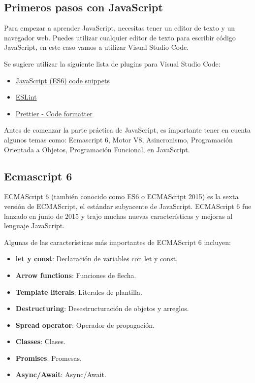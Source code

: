 \documentclass[
  a4paper,
  DIV=11,
  numbers=noendperiod,
  onepage,
  openany]{scrreprt}
\providecommand{\tightlist}{%
  \setlength{\itemsep}{0pt}\setlength{\parskip}{0pt}}\usepackage{longtable,booktabs,array}
\begin{document}
\begin{tcolorbox}
\chapter{Primeros pasos con
JavaScript}\label{primeros-pasos-con-javascript}

Para empezar a aprender JavaScript, necesitas tener un editor de texto y
un navegador web. Puedes utilizar cualquier editor de texto para
escribir código JavaScript, en este caso vamos a utilizar Visual Studio
Code.

Se sugiere utilizar la siguiente lista de plugins para Visual Studio
Code:

\begin{itemize}
\tightlist
\item
  \href{https://marketplace.visualstudio.com/items?itemName=xabikos.JavaScriptSnippets}{JavaScript
  (ES6) code snippets}
\item
  \href{https://marketplace.visualstudio.com/items?itemName=dbaeumer.vscode-eslint}{ESLint}
\item
  \href{https://marketplace.visualstudio.com/items?itemName=esbenp.prettier-vscode}{Prettier
  - Code formatter}
\end{itemize}

Antes de comenzar la parte práctica de JavaScript, es importante tener
en cuenta algunos temas como: Ecmascript 6, Motor V8, Asincronismo,
Programación Orientada a Objetos, Programación Funcional, en JavaScript.

\section{Ecmascript 6}\label{ecmascript-6}

ECMAScript 6 (también conocido como ES6 o ECMAScript 2015) es la sexta
versión de ECMAScript, el estándar subyacente de JavaScript. ECMAScript
6 fue lanzado en junio de 2015 y trajo muchas nuevas características y
mejoras al lenguaje JavaScript.

Algunas de las características más importantes de ECMAScript 6 incluyen:

\begin{itemize}
\tightlist
\item
  \textbf{let y const}: Declaración de variables con let y const.
\item
  \textbf{Arrow functions}: Funciones de flecha.
\item
  \textbf{Template literals}: Literales de plantilla.
\item
  \textbf{Destructuring}: Desestructuración de objetos y arreglos.
\item
  \textbf{Spread operator}: Operador de propagación.
\item
  \textbf{Classes}: Clases.
\item
  \textbf{Promises}: Promesas.
\item
  \textbf{Async/Await}: Async/Await.
\end{itemize}


\end{tcolorbox}
\end{document}
